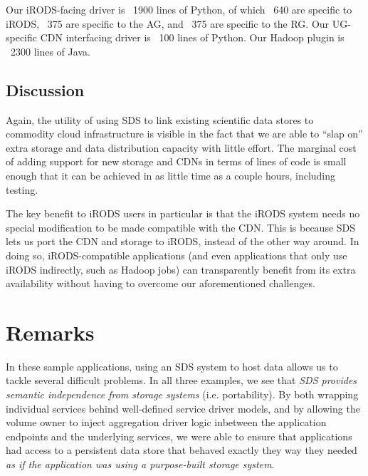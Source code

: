Our iRODS-facing driver is ~1900 lines of Python, of which ~640 are specific to
iRODS, ~375 are specific to the AG, and ~375 are specific to the RG.  Our
UG-specific CDN interfacing driver is ~100 lines of Python.  Our Hadoop plugin
is ~2300 lines of Java.

\subsection{Discussion}

Again, the utility of using SDS to link existing scientific data stores to
commodity cloud infrastructure is visible in the fact that we are able to ``slap
on'' extra storage and data distribution capacity with little effort.  The
marginal cost of adding support for new storage and CDNs in terms of lines of
code is small enough that it can be achieved in as little time as a couple
hours, including testing.

The key benefit to iRODS users in particular is that the iRODS system needs no
special modification to be made compatible with the CDN.  This is because
SDS lets us port the CDN and storage to iRODS, instead of the other way around.
In doing so, iRODS-compatible applications (and even applications that only use
iRODS indirectly, such as Hadoop jobs) can transparently benefit from its extra
availability without having to overcome our aforementioned challenges.

\section{Remarks}

In these sample applications, using an SDS system to host data allows us to
tackle several difficult problems.  In all three examples, we see
that \emph{SDS provides semantic independence from storage systems} (i.e.
portability).  By both wrapping individual services behind well-defined service driver models, and by
allowing the volume owner to inject aggregation driver logic inbetween the
application endpoints and the underlying services, we were able to ensure that applications
had access to a persistent data store that behaved exactly they way they needed
\emph{as if the application was using a purpose-built storage system}.

